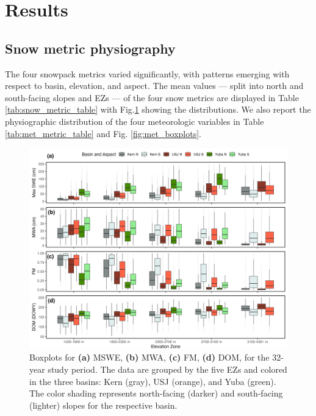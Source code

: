 \hypertarget{ch2-results}{\section{Results}\label{ch2-results}}
\hypertarget{ch2-results-1}{\subsection{Snow metric physiography}\label{ch2-results-1}}

The four snowpack metrics varied significantly, with patterns emerging with respect to basin, elevation, and aspect. The mean values --- split into north and south-facing slopes and EZs --- of the four snow metrics are displayed in Table \ref{tab:snow_metric_table} with Fig.\ref{fig:snow_boxplots} showing the distributions. We also report the physiographic distribution of the four meteorologic variables in Table \ref{tab:met_metric_table} and Fig. \ref{fig:met_boxplots}.

\begin{figure}[t]
\includegraphics[width=\textwidth]{figures/ch2_figs/snow4_boxplot_v5.png}
\caption{Boxplots for \textbf{(a)} MSWE, \textbf{(b)} MWA, \textbf{(c)} FM, \textbf{(d)} DOM, for the 32-year study period. The data are grouped by the five EZs and colored in the three basins: Kern (gray), USJ (orange), and Yuba (green). The color shading represents north-facing (darker) and south-facing (lighter) slopes for the respective basin.}
\label{fig:snow_boxplots}
\end{figure}

